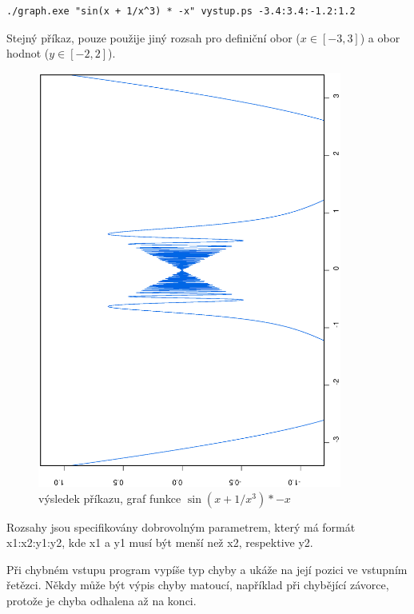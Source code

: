 \documentclass[11pt]{article}
\begin{document}
\begin{verbatim}
./graph.exe "sin(x + 1/x^3) * -x" vystup.ps -3.4:3.4:-1.2:1.2
\end{verbatim}
Stejný příkaz, pouze použije jiný rozsah pro definiční obor ($x \in [-3, 3]$) a
obor hodnot ($y \in [-2, 2]$).
\begin{figure}[ht!]
\centering
	\includegraphics[width=10cm,angle=270]{figures/vystup2.eps}
	\caption{výsledek příkazu, graf funkce $\sin \left(x + 1/x^3 \right) * -x$}
\end{figure}


Rozsahy jsou specifikovány dobrovolným parametrem, který má formát
x1:x2:y1:y2, kde x1 a y1 musí být menší než x2, respektive y2. 

Při chybném vstupu program vypíše typ chyby a ukáže na její pozici ve vstupním
řetězci. Někdy může být výpis chyby matoucí, například při chybějící závorce,
protože je chyba odhalena až na konci.
\end{document}
